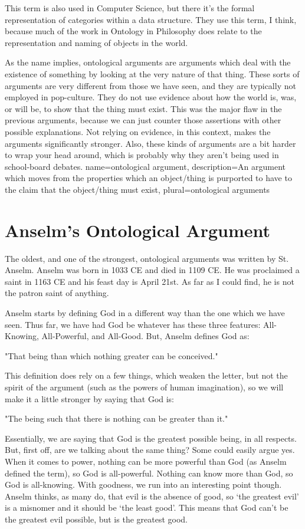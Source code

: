 This term is also used in Computer Science, but there it's the formal representation of categories within a data structure. They use this term, I think, because much of the work in Ontology in Philosophy does relate to the representation and naming of objects in the world. 

As the name implies, \glspl{ontological argument} are arguments which deal with the existence of something by looking at the very nature of that thing. These sorts of arguments are very different from those we have seen, and they are typically not employed in pop-culture. They do not use evidence about how the world is, was, or will be, to show that the thing must exist. This was the major flaw in the previous arguments, because we can just counter those assertions with other possible explanations. Not relying on evidence, in this context, makes the arguments significantly stronger. Also, these kinds of arguments are a bit harder to wrap your head around, which is probably why they aren't being used in school-board debates.
{
name=ontological argument,
description={An argument which moves from the properties which an object/thing is purported to have to the claim that the object/thing must exist},
plural=ontological arguments
}

\section{Anselm’s Ontological Argument}

The oldest, and one of the strongest, ontological arguments was written by St. Anselm. Anselm was born in 1033 CE and died in 1109 CE. He was proclaimed a saint in 1163 CE and his feast day is April 21st. As far as I could find, he is not the patron saint of anything. 

Anselm starts by defining God in a different way than the one which we have seen. Thus far, we have had God be whatever has these three features: All-Knowing, All-Powerful, and All-Good. But, Anselm defines God as:
\begin{center}
"That being than which nothing greater can be conceived."
\end{center}
This definition does rely on a few things, which weaken the letter, but not the spirit of the argument (such as the powers of human imagination), so we will make it a little stronger by saying that God is:
\begin{center}
"The being such that there is nothing can be greater than it."
\end{center}
Essentially, we are saying that God is the greatest possible being, in all respects. But, first off, are we talking about the same thing? Some could easily argue yes. When it comes to power, nothing can be more powerful than God (as Anselm defined the term), so God is all-powerful. Nothing can know more than God, so God is all-knowing. With goodness, we run into an interesting point though. Anselm thinks, as many do, that evil is the absence of good, so `the greatest evil' is a misnomer and it should be `the least good'. This means that God can't be the greatest evil possible, but is the greatest good.  

